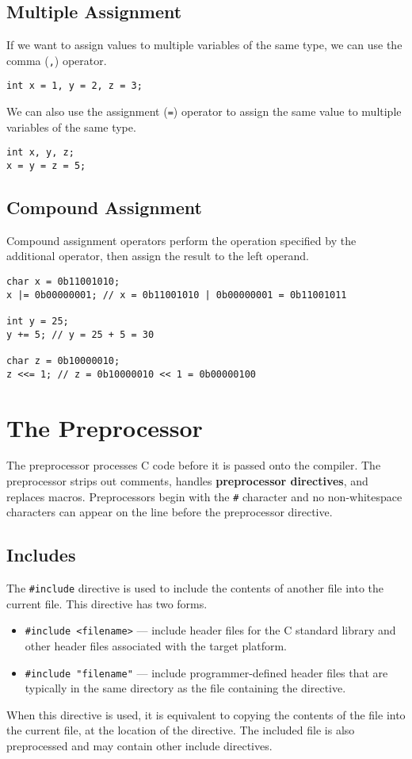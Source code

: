 \documentclass[a4paper]{report}
\begin{document}
\section{Multiple Assignment}
If we want to assign values to multiple variables of the same type, we
can use the comma (\texttt{,}) operator.
\begin{verbatim}
int x = 1, y = 2, z = 3;
\end{verbatim}
We can also use the assignment (\texttt{=}) operator to assign
the same value to multiple variables of the same type.
\begin{verbatim}
int x, y, z;
x = y = z = 5;
\end{verbatim}
\section{Compound Assignment}
Compound assignment operators perform the operation specified by the
additional operator, then assign the result to the left operand.
\begin{verbatim}
char x = 0b11001010;
x |= 0b00000001; // x = 0b11001010 | 0b00000001 = 0b11001011

int y = 25;
y += 5; // y = 25 + 5 = 30

char z = 0b10000010;
z <<= 1; // z = 0b10000010 << 1 = 0b00000100
\end{verbatim}
\chapter{The Preprocessor}
The preprocessor processes C code before it is passed onto the
compiler. The preprocessor strips out comments, handles
\textbf{preprocessor directives}, and replaces macros. Preprocessors
begin with the \texttt{#} character and no non-whitespace
characters can appear on the line before the preprocessor directive.
\section{Includes}
The \texttt{#include} directive is used to include the contents
of another file into the current file. This directive has two forms.
\begin{itemize}
    \item \texttt{#include <filename>} --- include header files for the C standard library and other header files associated with the target platform.
    \item \texttt{#include "filename"} --- include programmer-defined header files that are typically in the same directory as the file containing the directive. %
\end{itemize}
When this directive is used, it is equivalent to copying the contents of the file into the current file,
at the location of the directive. The included file is also preprocessed and may contain other include directives.
\end{document}
